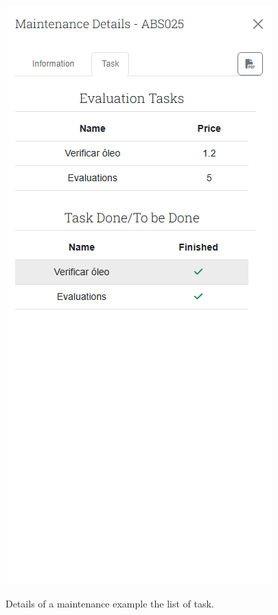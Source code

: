 \begin{figure}[htbp]
  \caption{Details of a maintenance example the list of task.}
  \centering
  \includegraphics[width=\textwidth]{figs/Implementation/client/MaintenanceDetailsTasks}
  \label{fig:MaintenanceDetailsTasks}
\end{figure}




